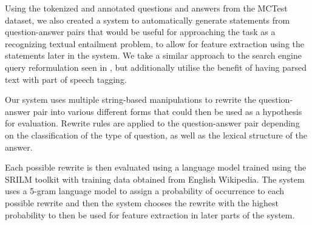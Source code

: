 Using the tokenized and annotated questions and answers from the MCTest dataset, we also created a system to automatically generate statements from question-answer pairs that would be useful for approaching the task as a recognizing textual entailment problem, to allow for feature extraction using the statements later in the system. We take a similar approach to the search engine query reformulation seen in \cite{brill02ananalysis}, but additionally utilise the benefit of having parsed text with part of speech tagging.

Our system uses multiple string-based manipulations to rewrite the question-answer pair into various different forms that could then be used as a hypothesis for evaluation. Rewrite rules are applied to the question-answer pair depending on the classification of the type of question, as well as the lexical structure of the answer.

Each possible rewrite is then evaluated using a language model trained using the SRILM toolkit \cite{Stolcke2002} with training data obtained from English Wikipedia. The system uses a 5-gram language model to assign a probability of occurrence to each possible rewrite and then the system chooses the rewrite with the highest probability to then be used for feature extraction in later parts of the system. 